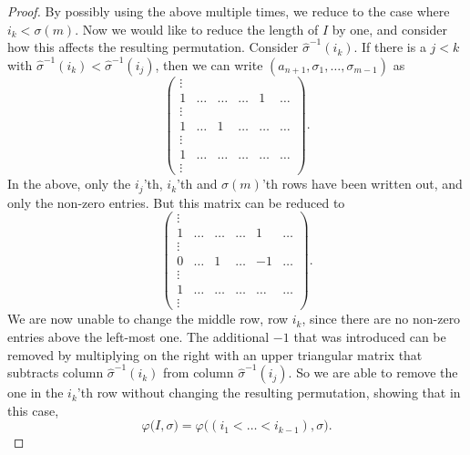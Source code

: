 \begin{proof}
  By possibly using the above multiple times, we reduce to the case
  where $i_k < \sigma(m)$. Now we would like to reduce the length of
  $I$ by one, and consider how this affects the resulting permutation.
  Consider $\widehat\sigma^{-1}(i_k)$. If
  there is a $j < k$ with $\widehat\sigma^{-1}(i_k) <
  \widehat\sigma^{-1}(i_j)$, then we can write
  $(a_{n+1},\sigma_1,\dots,\sigma_{m-1})$ as
  \[
  \begin{pmatrix}
    \vdots & \\
    1 & \dots & \dots & \dots & 1 & \dots\\
    \vdots \\
    1 & \dots & 1 & \dots & \dots & \dots\\
    \vdots & \\
    1 &  \dots & \dots & \dots & \dots & \dots\\
    \vdots
  \end{pmatrix}. \]
  In the above, only the $i_j$'th, $i_k$'th and $\sigma(m)$'th rows
  have been written out, and only the non-zero entries. But this
  matrix can be reduced to
  \[
  \begin{pmatrix}
    \vdots & \\
    1 & \dots & \dots & \dots & 1 & \dots\\
    \vdots \\
    0 & \dots & 1 & \dots & -1 & \dots\\
    \vdots & \\
    1 & \dots & \dots  & \dots & \dots & \dots\\
    \vdots
  \end{pmatrix}. \]
  We are now unable to change the middle row, row $i_k$, since there
  are no non-zero
  entries above the left-most one. The additional $-1$ that was
  introduced can be removed by multiplying on the right with an upper
  triangular matrix that subtracts column $\widehat\sigma^{-1}(i_k)$
  from column $\widehat\sigma^{-1}(i_j)$. So we are able to remove the
  one in the $i_k$'th row without changing the resulting permutation,
  showing that in this case,
  \[ \varphi\big(I,\sigma\big) =
  \varphi\big((i_1<\dots<i_{k-1}),\sigma\big). \]


\end{proof}
